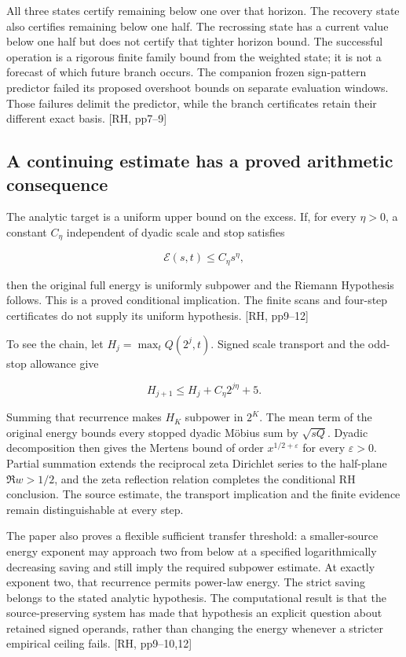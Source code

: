 All three states certify remaining below one over that horizon. The recovery state also certifies remaining below one half. The recrossing state has a current value below one half but does not certify that tighter horizon bound. The successful operation is a rigorous finite family bound from the weighted state; it is not a forecast of which future branch occurs. The companion frozen sign-pattern predictor failed its proposed overshoot bounds on separate evaluation windows. Those failures delimit the predictor, while the branch certificates retain their different exact basis. {[}RH, pp7--9{]}

\subsection{A continuing estimate has a proved arithmetic consequence}\label{a-continuing-estimate-has-a-proved-arithmetic-consequence}

The analytic target is a uniform upper bound on the excess. If, for every \(\eta>0\), a constant \(C_\eta\) independent of dyadic scale and stop satisfies

\[
\mathcal E(s,t)\le C_\eta s^\eta,
\]

then the original full energy is uniformly subpower and the Riemann Hypothesis follows. This is a proved conditional implication. The finite scans and four-step certificates do not supply its uniform hypothesis. {[}RH, pp9--12{]}

To see the chain, let \(H_j=\max_t Q(2^j,t)\). Signed scale transport and the odd-stop allowance give

\[
H_{j+1}\le H_j+C_\eta 2^{j\eta}+5.
\]

Summing that recurrence makes \(H_K\) subpower in \(2^K\). The mean term of the original energy bounds every stopped dyadic Möbius sum by \(\sqrt{sQ}\). Dyadic decomposition then gives the Mertens bound of order \(x^{1/2+\varepsilon}\) for every \(\varepsilon>0\). Partial summation extends the reciprocal zeta Dirichlet series to the half-plane \(\Re w>1/2\), and the zeta reflection relation completes the conditional RH conclusion. The source estimate, the transport implication and the finite evidence remain distinguishable at every step.

The paper also proves a flexible sufficient transfer threshold: a smaller-source energy exponent may approach two from below at a specified logarithmically decreasing saving and still imply the required subpower estimate. At exactly exponent two, that recurrence permits power-law energy. The strict saving belongs to the stated analytic hypothesis. The computational result is that the source-preserving system has made that hypothesis an explicit question about retained signed operands, rather than changing the energy whenever a stricter empirical ceiling fails. {[}RH, pp9--10,12{]}
